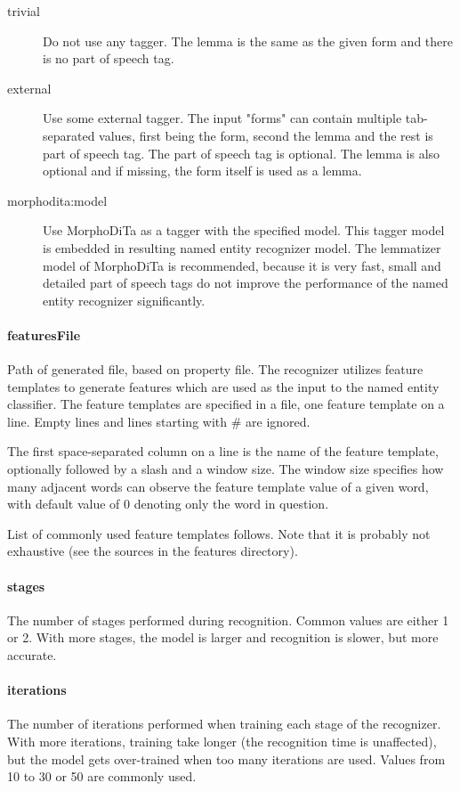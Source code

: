 \begin{description}
\item[trivial]
Do not use any tagger. The lemma is the same as the given form and there is no
part of speech tag.
\item[external]
Use some external tagger. The input "forms" can contain multiple tab-separated
values, first being the form, second the lemma and the rest is part of speech tag.
The part of speech tag is optional. The lemma is also optional and if missing,
the form itself is used as a lemma.
\item[morphodita:model]
Use MorphoDiTa as a tagger with the specified model. This tagger model is embedded
in resulting named entity recognizer model. The lemmatizer model of MorphoDiTa
is recommended, because it is very fast, small and detailed part of speech tags
do not improve the performance of the named entity recognizer significantly.
\end{description}

\paragraph{featuresFile}
Path of generated file, based on property file.
The recognizer utilizes feature templates to generate features which are used as
the input to the named entity classifier. The feature templates are specified in
a file, one feature template on a line. Empty lines and lines starting with \# are ignored.

The first space-separated column on a line is the name of the feature template,
optionally followed by a slash and a window size. The window size specifies how
many adjacent words can observe the feature template value of a given word, with
default value of 0 denoting only the word in question.

List of commonly used feature templates follows. Note that it is probably not
exhaustive (see the sources in the features directory).


\paragraph{stages}
The number of stages performed during recognition. Common values are either 1 or
2. With more stages, the model is larger and recognition is slower, but more accurate.

\paragraph{iterations}
The number of iterations performed when training each stage of the recognizer.
With more iterations, training take longer (the recognition time is unaffected),
but the model gets over-trained when too many iterations are used. Values from 10
to 30 or 50 are commonly used.

